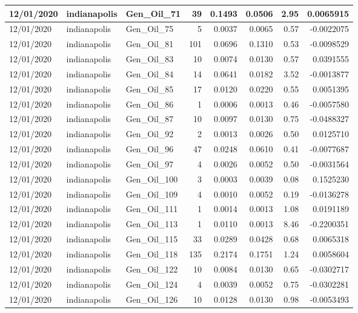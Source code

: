 \documentclass[
  letterpaper,
  DIV=11,
  numbers=noendperiod]{scrartcl}
\begin{document}
\begin{tabular}{l|l|l|r|r|r|r|r}
\hline
12/01/2020 & indianapolis & Gen\_Oil\_71 & 39 & 0.1493 & 0.0506 & 2.95 & 0.0065915\\
\hline
12/01/2020 & indianapolis & Gen\_Oil\_75 & 5 & 0.0037 & 0.0065 & 0.57 & -0.0022075\\
\hline
12/01/2020 & indianapolis & Gen\_Oil\_81 & 101 & 0.0696 & 0.1310 & 0.53 & -0.0098529\\
\hline
12/01/2020 & indianapolis & Gen\_Oil\_83 & 10 & 0.0074 & 0.0130 & 0.57 & 0.0391555\\
\hline
12/01/2020 & indianapolis & Gen\_Oil\_84 & 14 & 0.0641 & 0.0182 & 3.52 & -0.0013877\\
\hline
12/01/2020 & indianapolis & Gen\_Oil\_85 & 17 & 0.0120 & 0.0220 & 0.55 & 0.0051395\\
\hline
12/01/2020 & indianapolis & Gen\_Oil\_86 & 1 & 0.0006 & 0.0013 & 0.46 & -0.0057580\\
\hline
12/01/2020 & indianapolis & Gen\_Oil\_87 & 10 & 0.0097 & 0.0130 & 0.75 & -0.0488327\\
\hline
12/01/2020 & indianapolis & Gen\_Oil\_92 & 2 & 0.0013 & 0.0026 & 0.50 & 0.0125710\\
\hline
12/01/2020 & indianapolis & Gen\_Oil\_96 & 47 & 0.0248 & 0.0610 & 0.41 & -0.0077687\\
\hline
12/01/2020 & indianapolis & Gen\_Oil\_97 & 4 & 0.0026 & 0.0052 & 0.50 & -0.0031564\\
\hline
12/01/2020 & indianapolis & Gen\_Oil\_100 & 3 & 0.0003 & 0.0039 & 0.08 & 0.1525230\\
\hline
12/01/2020 & indianapolis & Gen\_Oil\_109 & 4 & 0.0010 & 0.0052 & 0.19 & -0.0136278\\
\hline
12/01/2020 & indianapolis & Gen\_Oil\_111 & 1 & 0.0014 & 0.0013 & 1.08 & 0.0191189\\
\hline
12/01/2020 & indianapolis & Gen\_Oil\_113 & 1 & 0.0110 & 0.0013 & 8.46 & -0.2200351\\
\hline
12/01/2020 & indianapolis & Gen\_Oil\_115 & 33 & 0.0289 & 0.0428 & 0.68 & 0.0065318\\
\hline
12/01/2020 & indianapolis & Gen\_Oil\_118 & 135 & 0.2174 & 0.1751 & 1.24 & 0.0058604\\
\hline
12/01/2020 & indianapolis & Gen\_Oil\_122 & 10 & 0.0084 & 0.0130 & 0.65 & -0.0302717\\
\hline
12/01/2020 & indianapolis & Gen\_Oil\_124 & 4 & 0.0039 & 0.0052 & 0.75 & -0.0302281\\
\hline
12/01/2020 & indianapolis & Gen\_Oil\_126 & 10 & 0.0128 & 0.0130 & 0.98 & -0.0053493\\

\end{tabular}
\end{document}
